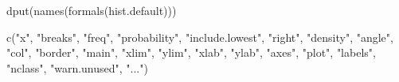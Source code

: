 \begin{Schunk}
\begin{Sinput}
 dput(names(formals(hist.default)))
\end{Sinput}
\begin{Soutput}
c("x", "breaks", "freq", "probability", "include.lowest", "right", 
"density", "angle", "col", "border", "main", "xlim", "ylim", 
"xlab", "ylab", "axes", "plot", "labels", "nclass", "warn.unused", 
"...")
\end{Soutput}
\end{Schunk}
